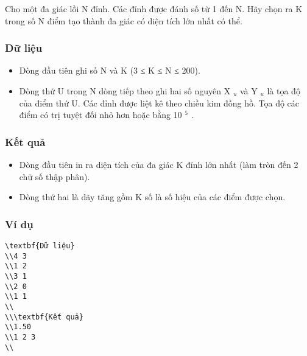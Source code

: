 







   Cho một đa giác lồi N đỉnh. Các đỉnh được đánh số từ 1 đến N. Hãy chọn ra K trong số N điểm tạo thành đa giác có diện tích lớn nhất có thể.  

\subsubsection{   Dữ liệu  }
\begin{itemize}
	\item     Dòng đầu tiên ghi số N và K (3 ≤ K ≤ N ≤ 200).   
	\item     Dòng thứ U trong N dòng tiếp theo ghi hai số nguyên X    $_     u    $    và Y    $_     u    $    là tọa độ của điểm thứ U. Các đỉnh được liệt kê theo chiều kim đồng hồ. Tọa độ các điểm có trị tuyệt đối nhỏ hơn hoặc bằng 10    $^     5    $    .   
\end{itemize}

\subsubsection{   Kết quả  }
\begin{itemize}
	\item     Dòng đầu tiên in ra diện tích của đa giác K đỉnh lớn nhất (làm tròn đến 2 chữ số thập phân).   
	\item     Dòng thứ hai là dãy tăng gồm K số là số hiệu của các điểm được chọn.   
\end{itemize}

\subsubsection{   Ví dụ  }
\begin{verbatim}
\textbf{Dữ liệu}
\\4 3
\\1 2
\\3 1
\\2 0
\\1 1
\\
\\\textbf{Kết quả}
\\1.50
\\1 2 3
\\\end{verbatim}

